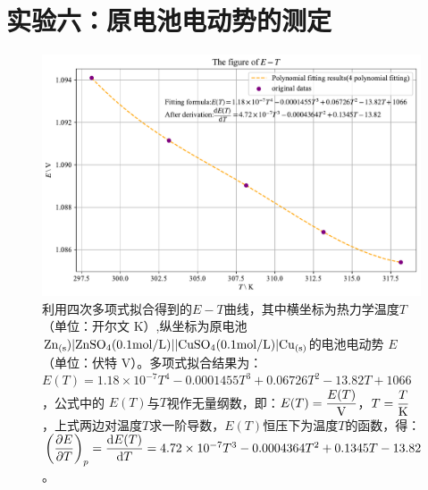\documentclass[UTF8,AutoFakeBold,a4paper]{article}
\begin{document}
\newpage
	\section{}
	\newpage
	\section{}
	\newpage
	\section{实验六：原电池电动势的测定}
	\begin{figure}[h]
	\centering
	\includegraphics[scale=0.63]{6}
	\caption{利用四次多项式拟合得到的$E-T$曲线，其中横坐标为热力学温度$T$（单位：开尔文 K）,纵坐标为原电池$\ce{Zn}_{(\rm{s}})|\ce{ZnSO4}(0.1\rm{mol}/L)||\ce{CuSO4}(0.1\rm{mol/L})|\ce{Cu}_{(\rm{s})}$的电池电动势 $E$（单位：伏特 V）。多项式拟合结果为：\textcolor[rgb]{0.54,0.13,0.33}{$E(T) =1.18\times 10^{-7} T^{4} - 0.0001455 T^{3} + 0.06726 T^{2} - 13.82 T + 1066$}，公式中的 $E(T)$与$T$视作无量纲数，即：$E(T) = \dfrac{E(T)}{\ce{V}}$，$T = \dfrac{T}{\ce{K}}$，上式两边对温度$T$求一阶导数，$E(T)$恒压下为温度$T$的函数，得：\textcolor[rgb]{0.54,0.13,0.33}{$\pqty{\dfrac{\partial E}{\partial T}}_{p} = \dfrac{{\rm{d}}E(T)}{{\rm{d}}T} = 4.72\times 10^{-7} T^{3} - 0.0004364 T^{2} + 0.1345 T - 13.82$}。}
	\label{fi1}
\end{figure}
\newpage
\end{document}
